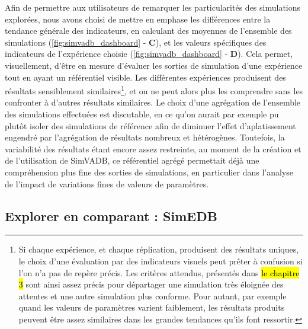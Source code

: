 	Afin de permettre aux utilisateurs de remarquer les particularités des simulations explorées, nous avons choisi de mettre en emphase les différences entre la tendance générale des indicateurs, en calculant des moyennes de l'ensemble des simulations (\cref{fig:simvadb_dashboard} - \textbf{C}), et les valeurs spécifiques des indicateurs de l'expérience choisie (\cref{fig:simvadb_dashboard} - \textbf{D}).
	Cela permet, visuellement, d'être en mesure d'évaluer les sorties de simulation d'une expérience tout en ayant un référentiel visible.
	Les différentes expériences produisent des résultats sensiblement similaires\footnote{
		Si chaque expérience, et chaque réplication, produisent des résultats uniques, le choix d'une évaluation par des indicateurs visuels peut prêter à confusion si l'on n'a pas de repère précis.
		Les critères attendus, présentés dans \hl{le chapitre 3} sont ainsi assez précis pour départager une simulation très éloignée des attentes et une autre simulation plus conforme.
		Pour autant, par exemple quand les valeurs de paramètres varient faiblement, les résultats produits peuvent être assez similaires dans les grandes tendances qu'ils font ressortir.
	}, et on ne peut alors plus les comprendre sans les confronter à d'autres résultats similaires.
	Le choix d'une agrégation de l'ensemble des simulations effectuées est discutable, en ce qu'on aurait par exemple pu plutôt isoler des simulations \og de référence \fg{} afin de diminuer l'effet \og d'aplatissement \fg{} engendré par l'agrégation de résultats nombreux et hétérogènes.
	Toutefois, la variabilité des résultats étant encore assez restreinte, au moment de la création et de l'utilisation de SimVADB, ce référentiel agrégé permettait déjà une compréhension plus fine des sorties de simulations, en particulier dans l'analyse de l'impact de variations fines de valeurs de paramètres.

	\subsection{Explorer en comparant : SimEDB}\label{subsec:explorer-simedb}

